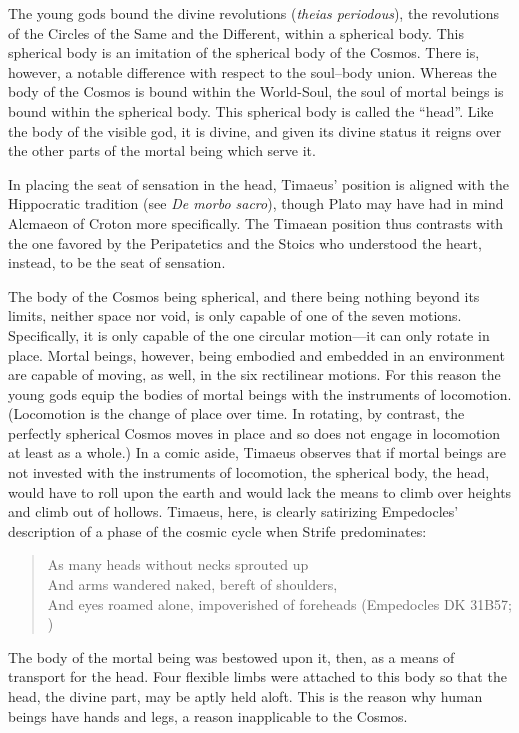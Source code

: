 The young gods bound the divine revolutions (\emph{theias periodous}), the revolutions of the Circles of the Same and the Different, within a spherical body. This spherical body is an imitation of the spherical body of the Cosmos. There is, however, a notable difference with respect to the soul--body union. Whereas the body of the Cosmos is bound within the World-Soul, the soul of mortal beings is bound within the spherical body. This spherical body is called the ``head''. Like the body of the visible god, it is divine, and given its divine status it reigns over the other parts of the mortal being which serve it. 

In placing the seat of sensation in the head, Timaeus' position is aligned with the Hippocratic tradition (see \emph{De morbo sacro}), though Plato may have had in mind Alcmaeon of Croton more specifically. The Timaean position thus contrasts with the one favored by the Peripatetics and the Stoics who understood the heart, instead, to be the seat of sensation.

The body of the Cosmos being spherical, and there being nothing beyond its limits, neither space nor void, is only capable of one of the seven motions. Specifically, it is only capable of the one circular motion---it can only rotate in place. Mortal beings, however, being embodied and embedded in an environment are capable of moving, as well, in the six rectilinear motions. For this reason the young gods equip the bodies of mortal beings with the instruments of locomotion. (Locomotion is the change of place over time. In rotating, by contrast, the perfectly spherical Cosmos moves in place and so does not engage in locomotion at least as a whole.) In a comic aside, Timaeus observes that if mortal beings are not invested with the instruments of locomotion, the spherical body, the head, would have to roll upon the earth and would lack the means to climb over heights and climb out of hollows. Timaeus, here, is clearly satirizing Empedocles' description of a phase of the cosmic cycle when Strife predominates:
\begin{verse}
	As many heads without necks sprouted up\\
	And arms wandered naked, bereft of shoulders,\\
	And eyes roamed alone, impoverished of foreheads (Empedocles DK 31B57; \citealt[245]{Inwood:2001ve})
\end{verse}

The body of the mortal being was bestowed upon it, then, as a means of transport for the head. Four flexible limbs were attached to this body so that the head, the divine part, may be aptly held aloft. This is the reason why human beings have hands and legs, a reason inapplicable to the Cosmos. 

